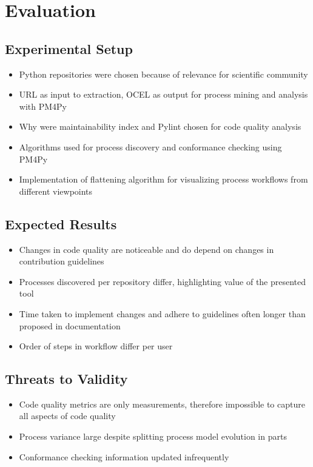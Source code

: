 \chapter{Evaluation}
\label{chap:eval}

\section{Experimental Setup}
\begin{itemize}
	\item Python repositories were chosen because of relevance for scientific community
	\item URL as input to extraction, OCEL as output for process mining and analysis with PM4Py
	\item Why were maintainability index and Pylint chosen for code quality analysis
	\item Algorithms used for process discovery and conformance checking using PM4Py
	\item Implementation of flattening algorithm for visualizing process workflows from different viewpoints
\end{itemize}

\section{Expected Results}
\begin{itemize}
	\item Changes in code quality are noticeable and do depend  on changes in contribution guidelines
	\item Processes discovered per repository differ, highlighting value of the presented tool
	\item Time taken to implement changes and adhere to guidelines often longer than proposed in documentation
	\item Order of steps in workflow differ per user
\end{itemize}

\section{Threats to Validity}
\begin{itemize}
	\item Code quality metrics are only measurements, therefore impossible to capture all aspects of code quality
	\item Process variance large despite splitting process model evolution in parts
	\item Conformance checking information updated infrequently
\end{itemize}

